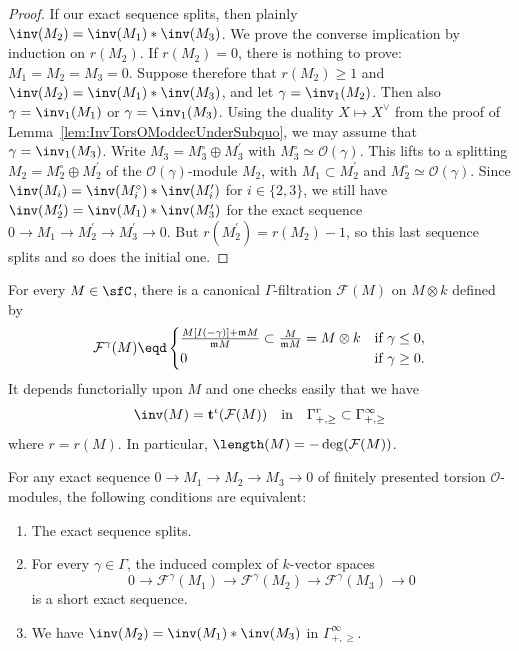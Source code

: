 \begin{proof}
If our exact sequence splits, then plainly $\inv(M_{2})=\inv(M_{1})\ast\inv(M_{3})$. We prove the converse implication by induction on $r(M_{2})$. If $r(M_{2})=0$, there is nothing to prove: $M_{1}=M_{2}=M_{3}=0$. Suppose therefore that $r(M_{2})\geq1$ and $\inv(M_{2})=\inv(M_{1})\ast\inv(M_{3})$, and let $\gamma=\inv_{1}(M_{2})$. Then also $\gamma=\inv_{1}(M_{1})$ or $\gamma=\inv_{1}(M_{3})$. Using the duality $X\mapsto X^{\vee}$ from the proof of Lemma~\ref{lem:InvTorsOModdecUnderSubquo}, we may assume that $\gamma=\inv_{1}(M_{3})$. Write $M_{3}=M_{3}^{\circ}\oplus M_{3}^{\prime}$ with $M_{3}^{\circ}\simeq\mathcal{O}(\gamma)$. This lifts to a splitting $M_{2}=M_{2}^{\circ}\oplus M_{2}^{\prime}$ of the $\mathcal{O}(\gamma)$-module $M_{2}$, with $M_{1}\subset M_{2}^{\prime}$ and $M_{2}^{\circ}\simeq\mathcal{O}(\gamma)$. Since $\inv(M_{i})=\inv(M_{i}^{\circ})\ast\inv(M_{i}^{\prime})$ for $i\in\{2,3\}$, we still have $\inv(M_{2}^{\prime})=\inv(M_{1})\ast\inv(M_{3}^{\prime})$ for the exact sequence $0\rightarrow M_{1}\rightarrow M_{2}^{\prime}\rightarrow M_{3}^{\prime}\rightarrow0$. But $r(M_{2}^{\prime})=r(M_{2})-1$, so this last sequence splits and so does the initial one.
\end{proof}

For every $M\in\sfC$, there is a canonical $\Gamma$-filtration $\mathcal{F}(M)$ on $M\otimes k$ defined by
\[
\mathcal{F}^{\gamma}(M)\eqd
\begin{cases}
\frac{M[I(-\gamma)]+\mathfrak{m}M}{\mathfrak{m}M}\subset\frac{M}{\mathfrak{m}M}=M\otimes k & \text{if }\gamma\leq0,\\
0 & \text{if }\gamma\geq0.
\end{cases}
\]
It depends functorially upon $M$ and one checks easily that we have
\[
\inv(M)=\mathbf{t}^{\iota}(\mathcal{F}(M))\quad\text{in}\quad\Gamma_{+,\geq}^{r}\subset\Gamma_{+,\geq}^{\infty}
\]
where $r=r(M)$. In particular, $\length(M)=-\deg(\mathcal{F}(M))$.

\begin{lemm}\label{lem:InvTorsOModExSeqCaseEqual}
For any exact sequence $0\rightarrow M_{1}\rightarrow M_{2}\rightarrow M_{3}\rightarrow0$ of finitely presented torsion $\mathcal{O}$-modules, the following conditions are equivalent:
\begin{enumerate}
\item \label{1.8.1} The exact sequence splits.
\item \label{1.8.2} For every $\gamma\in\Gamma$, the induced complex of $k$-vector spaces
\[
0\rightarrow\mathcal{F}^{\gamma}(M_{1})\rightarrow\mathcal{F}^{\gamma}(M_{2})\rightarrow\mathcal{F}^{\gamma}(M_{3})\rightarrow0
\]
is a short exact sequence.
\item \label{1.8.3} We have $\inv(M_{2})=\inv(M_{1})\ast\inv(M_{3})$ in $\Gamma_{+,\geq}^{\infty}$.
\end{enumerate}
\end{lemm}

